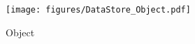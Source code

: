 \begin{figure}[H]
    \centering
    \texttt{[image: figures/DataStore\_Object.pdf]}
    \caption{\DataStore{} Object}
\end{figure}
